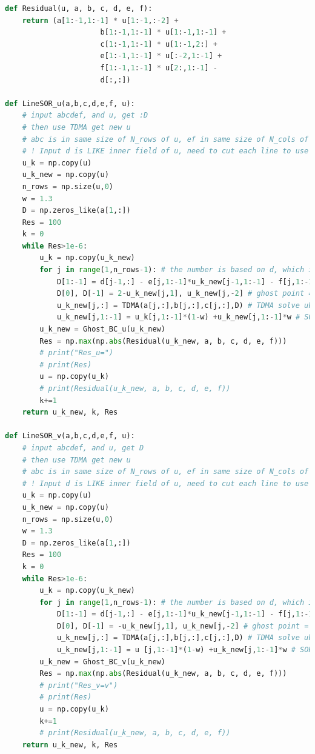 \documentclass[12pt]{article}
\begin{document}
\begin{scriptsize}
\begin{lstlisting}[language=python,caption={N-S Cylinder Solver}]
def Residual(u, a, b, c, d, e, f):
    return (a[1:-1,1:-1] * u[1:-1,:-2] +
                      b[1:-1,1:-1] * u[1:-1,1:-1] +
                      c[1:-1,1:-1] * u[1:-1,2:] +
                      e[1:-1,1:-1] * u[:-2,1:-1] +
                      f[1:-1,1:-1] * u[2:,1:-1] -
                      d[:,:])

def LineSOR_u(a,b,c,d,e,f, u): 
    # input abcdef, and u, get :D
    # then use TDMA get new u
    # abc is in same size of N_rows of u, ef in same size of N_cols of u
    # ! Input d is LIKE inner field of u, need to cut each line to use !
    u_k = np.copy(u)
    u_k_new = np.copy(u)
    n_rows = np.size(u,0)
    w = 1.3
    D = np.zeros_like(a[1,:])
    Res = 100
    k = 0
    while Res>1e-6:
        u_k = np.copy(u_k_new) 
        for j in range(1,n_rows-1): # the number is based on d, which is (N-1)x(N-1)
            D[1:-1] = d[j-1,:] - e[j,1:-1]*u_k_new[j-1,1:-1] - f[j,1:-1]*u_k_new[j+1,1:-1]
            D[0], D[-1] = 2-u_k_new[j,1], u_k_new[j,-2] # ghost point = ghost point
            u_k_new[j,:] = TDMA(a[j,:],b[j,:],c[j,:],D) # TDMA solve uk each line
            u_k_new[j,1:-1] = u_k[j,1:-1]*(1-w) +u_k_new[j,1:-1]*w # SOR term
        u_k_new = Ghost_BC_u(u_k_new)
        Res = np.max(np.abs(Residual(u_k_new, a, b, c, d, e, f)))
        # print("Res_u=")
        # print(Res) 
        u = np.copy(u_k)
        # print(Residual(u_k_new, a, b, c, d, e, f))
        k+=1
    return u_k_new, k, Res

def LineSOR_v(a,b,c,d,e,f, u): 
    # input abcdef, and u, get D
    # then use TDMA get new u
    # abc is in same size of N_rows of u, ef in same size of N_cols of u
    # ! Input d is LIKE inner field of u, need to cut each line to use !
    u_k = np.copy(u)
    u_k_new = np.copy(u)
    n_rows = np.size(u,0)
    w = 1.3
    D = np.zeros_like(a[1,:])
    Res = 100
    k = 0
    while Res>1e-6:
        u_k = np.copy(u_k_new) 
        for j in range(1,n_rows-1): # the number is based on d, which is (N-1)x(N-1)
            D[1:-1] = d[j-1,:] - e[j,1:-1]*u_k_new[j-1,1:-1] - f[j,1:-1]*u_k_new[j+1,1:-1]
            D[0], D[-1] = -u_k_new[j,1], u_k_new[j,-2] # ghost point = ghost point
            u_k_new[j,:] = TDMA(a[j,:],b[j,:],c[j,:],D) # TDMA solve uk each line
            u_k_new[j,1:-1] = u [j,1:-1]*(1-w) +u_k_new[j,1:-1]*w # SOR term
        u_k_new = Ghost_BC_v(u_k_new)
        Res = np.max(np.abs(Residual(u_k_new, a, b, c, d, e, f)))
        # print("Res_v=v")
        # print(Res) 
        u = np.copy(u_k)
        k+=1
        # print(Residual(u_k_new, a, b, c, d, e, f))
    return u_k_new, k, Res


\end{lstlisting}
\end{scriptsize}
\end{document}
